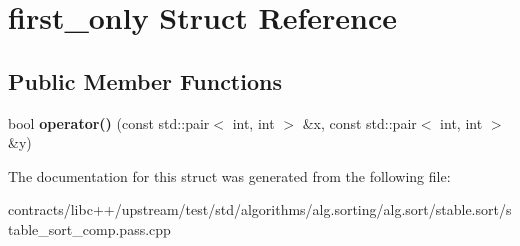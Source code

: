 \hypertarget{structfirst__only}{}\section{first\+\_\+only Struct Reference}
\label{structfirst__only}
\subsection*{Public Member Functions}
\begin{DoxyCompactItemize}
\item 
\mbox{\label{structfirst__only_a332b4f131150f3a042bdd194df35a1c7}} 
bool {\bfseries operator()} (const std\+::pair$<$ int, int $>$ \&x, const std\+::pair$<$ int, int $>$ \&y)
\end{DoxyCompactItemize}


The documentation for this struct was generated from the following file\+:\begin{DoxyCompactItemize}
\item 
contracts/libc++/upstream/test/std/algorithms/alg.\+sorting/alg.\+sort/stable.\+sort/stable\+\_\+sort\+\_\+comp.\+pass.\+cpp\end{DoxyCompactItemize}
